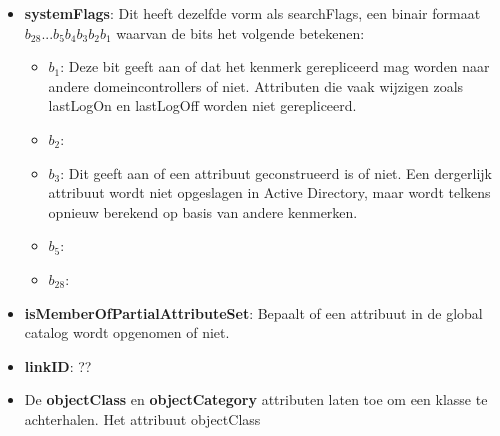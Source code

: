 \documentclass{report}
\begin{document}
\begin{enumerate}
{\begin{itemize}
\begin{itemize}
					\item \textbf{$b_7$}: 
					\item \textbf{$b_8$}: 
					\item \textbf{$b_9$}: 
					\item \textbf{$b_{10}$}: 
				\end{itemize}
				\item \textbf{systemFlags}: Dit heeft dezelfde vorm als searchFlags, een binair formaat $b_{28}...b_{5}b_{4}b_3b_2b_1$ waarvan de bits het volgende betekenen:
				\begin{itemize}
					\item \textbf{$b_1$}: Deze bit geeft aan of dat het kenmerk gerepliceerd mag worden naar andere domeincontrollers of niet. Attributen die vaak wijzigen zoals lastLogOn en lastLogOff worden niet gerepliceerd.
					\item \textbf{$b_2$}: 
					\item \textbf{$b_3$}: Dit geeft aan of een attribuut geconstrueerd is of niet. Een dergerlijk attribuut wordt niet opgeslagen in Active Directory, maar wordt telkens opnieuw berekend op basis van andere kenmerken.
					\item \textbf{$b_5$}: 
					\item \textbf{$b_28$}: 
				\end{itemize}
				\item \textbf{isMemberOfPartialAttributeSet}: Bepaalt of een attribuut in de global catalog wordt opgenomen of niet.
				\item \textbf{linkID}: ??
			\end{itemize}
		}
		
		 { }
		
		 { 
			\begin{itemize}
				\item De \textbf{objectClass} en \textbf{objectCategory} attributen laten toe om een klasse te achterhalen. Het attribuut objectClass 
			\end{itemize}	
		}
	\end{enumerate}
	
\end{document}
